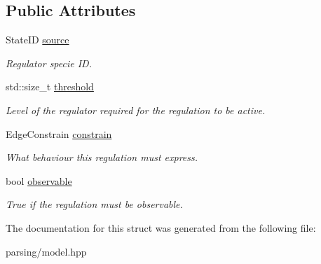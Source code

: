 \subsection*{\-Public \-Attributes}
\begin{DoxyCompactItemize}
\item 
\hypertarget{structModel_1_1Regulation_acf078ad2d1d840bf6a2301e8e4e00d31}{\-State\-I\-D \hyperlink{structModel_1_1Regulation_acf078ad2d1d840bf6a2301e8e4e00d31}{source}}\label{structModel_1_1Regulation_acf078ad2d1d840bf6a2301e8e4e00d31}

\begin{DoxyCompactList}\small\item\em \-Regulator specie \-I\-D. \end{DoxyCompactList}\item 
\hypertarget{structModel_1_1Regulation_aae984ea6455e15450fe8eaf7783698ee}{std\-::size\-\_\-t \hyperlink{structModel_1_1Regulation_aae984ea6455e15450fe8eaf7783698ee}{threshold}}\label{structModel_1_1Regulation_aae984ea6455e15450fe8eaf7783698ee}

\begin{DoxyCompactList}\small\item\em \-Level of the regulator required for the regulation to be active. \end{DoxyCompactList}\item 
\hypertarget{structModel_1_1Regulation_adff0de5ab845ed4172e5c78e2e219ef0}{\-Edge\-Constrain \hyperlink{structModel_1_1Regulation_adff0de5ab845ed4172e5c78e2e219ef0}{constrain}}\label{structModel_1_1Regulation_adff0de5ab845ed4172e5c78e2e219ef0}

\begin{DoxyCompactList}\small\item\em \-What behaviour this regulation must express. \end{DoxyCompactList}\item 
\hypertarget{structModel_1_1Regulation_ac04080a09616c9378c7d80c8d3f18949}{bool \hyperlink{structModel_1_1Regulation_ac04080a09616c9378c7d80c8d3f18949}{observable}}\label{structModel_1_1Regulation_ac04080a09616c9378c7d80c8d3f18949}

\begin{DoxyCompactList}\small\item\em \-True if the regulation must be observable. \end{DoxyCompactList}\end{DoxyCompactItemize}


\-The documentation for this struct was generated from the following file\-:\begin{DoxyCompactItemize}
\item 
parsing/model.\-hpp\end{DoxyCompactItemize}

